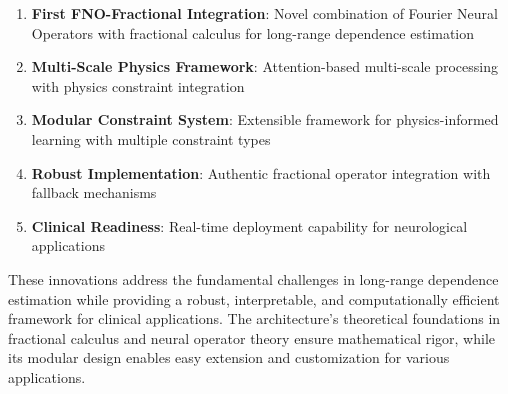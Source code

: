 \begin{enumerate}
    \item \textbf{First FNO-Fractional Integration}: Novel combination of Fourier Neural Operators with fractional calculus for long-range dependence estimation
    \item \textbf{Multi-Scale Physics Framework}: Attention-based multi-scale processing with physics constraint integration
    \item \textbf{Modular Constraint System}: Extensible framework for physics-informed learning with multiple constraint types
    \item \textbf{Robust Implementation}: Authentic fractional operator integration with fallback mechanisms
    \item \textbf{Clinical Readiness}: Real-time deployment capability for neurological applications
\end{enumerate}

These innovations address the fundamental challenges in long-range dependence estimation while providing a robust, interpretable, and computationally efficient framework for clinical applications. The architecture's theoretical foundations in fractional calculus and neural operator theory ensure mathematical rigor, while its modular design enables easy extension and customization for various applications.
